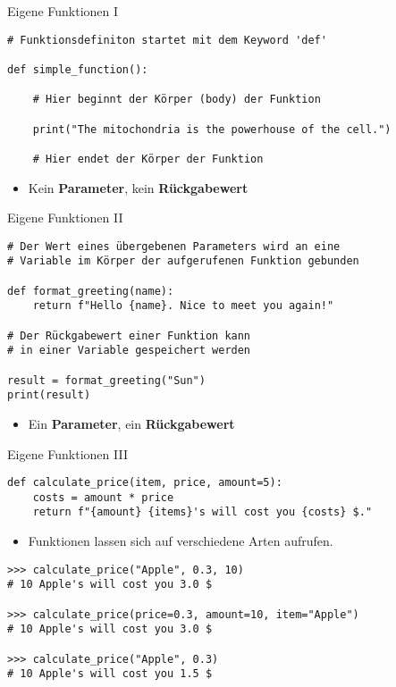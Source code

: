 \begin{frame}[fragile]{Eigene Funktionen I}
\begin{lstlisting}
# Funktionsdefiniton startet mit dem Keyword 'def'

def simple_function():

    # Hier beginnt der Körper (body) der Funktion

    print("The mitochondria is the powerhouse of the cell.")

    # Hier endet der Körper der Funktion
\end{lstlisting}
\begin{itemize}
    \item Kein \textbf{Parameter}, kein \textbf{Rückgabewert}
\end{itemize}
\end{frame}

\begin{frame}[fragile]{Eigene Funktionen II}
\begin{lstlisting}
# Der Wert eines übergebenen Parameters wird an eine
# Variable im Körper der aufgerufenen Funktion gebunden

def format_greeting(name):
    return f"Hello {name}. Nice to meet you again!"

# Der Rückgabewert einer Funktion kann
# in einer Variable gespeichert werden

result = format_greeting("Sun")
print(result)
\end{lstlisting}
\begin{itemize}
    \item Ein \textbf{Parameter}, ein \textbf{Rückgabewert}
\end{itemize}
\end{frame}

\begin{frame}[fragile]{Eigene Funktionen III}
\begin{lstlisting}
def calculate_price(item, price, amount=5):
    costs = amount * price
    return f"{amount} {items}'s will cost you {costs} $."
\end{lstlisting}
\begin{itemize}
    \item Funktionen lassen sich auf verschiedene Arten aufrufen.
\end{itemize}
\begin{lstlisting}
>>> calculate_price("Apple", 0.3, 10)
# 10 Apple's will cost you 3.0 $

>>> calculate_price(price=0.3, amount=10, item="Apple")
# 10 Apple's will cost you 3.0 $

>>> calculate_price("Apple", 0.3)
# 10 Apple's will cost you 1.5 $
\end{lstlisting}
\end{frame}

